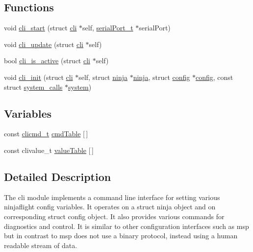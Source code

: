 \subsection*{Functions}
\begin{DoxyCompactItemize}
\item 
void \hyperlink{group__cli_ga9a15dcaa435e2730133b192c95b414b2}{cli\+\_\+start} (struct \hyperlink{structcli}{cli} $\ast$self, \hyperlink{drivers_2serial_8h_a64a5e2f04e1a908fbb1b3b165f88e0ef}{serial\+Port\+\_\+t} $\ast$serial\+Port)
\item 
void \hyperlink{group__cli_gad89d0eb0ace6d2cee2e6d6a8764b3cfa}{cli\+\_\+update} (struct \hyperlink{structcli}{cli} $\ast$self)
\item 
bool \hyperlink{group__cli_ga07cabae67e1757062ade92c423f8ab78}{cli\+\_\+is\+\_\+active} (struct \hyperlink{structcli}{cli} $\ast$self)
\item 
void \hyperlink{group__cli_gaec92eebacf7afaa7c53413a6935c38b8}{cli\+\_\+init} (struct \hyperlink{structcli}{cli} $\ast$self, struct \hyperlink{structninja}{ninja} $\ast$\hyperlink{structninja}{ninja}, struct \hyperlink{structconfig}{config} $\ast$\hyperlink{structconfig}{config}, const struct \hyperlink{structsystem__calls}{system\+\_\+calls} $\ast$\hyperlink{config_8h_a2c2c170dddadaff6ffd4467b45986b25}{system})
\end{DoxyCompactItemize}
\subsection*{Variables}
\begin{DoxyCompactItemize}
\item 
const \hyperlink{structclicmd__t}{clicmd\+\_\+t} \hyperlink{group__cli_ga1c33d301f2139455db286a7ab2a71294}{cmd\+Table} \mbox{[}$\,$\mbox{]}
\item 
const clivalue\+\_\+t \hyperlink{group__cli_ga79168a98a1e62714ea2cf50939e5465a}{value\+Table} \mbox{[}$\,$\mbox{]}
\end{DoxyCompactItemize}


\subsection{Detailed Description}
The cli module implements a command line interface for setting various ninjaflight config variables. It operates on a struct ninja object and on corresponding struct config object. It also provides various commands for diagnostics and control. It is similar to other configuration interfaces such as msp but in contrast to msp does not use a binary protocol, instead using a human readable stream of data. 

